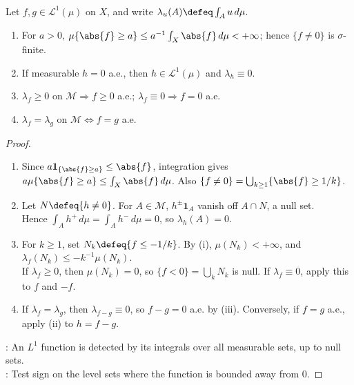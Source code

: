 \begin{proposition} \label{prop:l1-level-sets-null-and-indefinite-integrals} \\
Let $f,g\in\mathscr{L}^1(\mu)$ on $X$, and write $\lambda_u(A)\defeq\int_Au\,d\mu$.
\begin{enumerate}[label=(\roman*)]
\setlength{\itemsep}{0pt}
\item For $a>0$, $\mu\{\abs{f}\geq a\}\leq a^{-1}\int_X\abs{f}\,d\mu<+\infty$; hence $\{f\neq0\}$ is $\sigma$-finite.
\item If measurable $h=0$ a.e., then $h\in\mathscr{L}^1(\mu)$ and $\lambda_h\equiv0$.
\item $\lambda_f\geq0$ on $\mathcal{M}\Longrightarrow f\geq0$ a.e.; $\lambda_f\equiv0\Longrightarrow f=0$ a.e.
\item $\lambda_f=\lambda_g$ on $\mathcal{M}\Longleftrightarrow f=g$ a.e.
\end{enumerate}
\begin{proof}
\begin{enumerate}[label=(\roman*)]
\setlength{\itemsep}{0pt}
\item Since $a\mathbf{1}_{\{\abs{f}\geq a\}}\leq\abs{f}$, integration gives $a\mu\{\abs{f}\geq a\}\leq\int_X\abs{f}\,d\mu$. Also $\{f\neq0\}=\bigcup_{k\geq1}\{\abs{f}\geq1/k\}$.
\item Let $N\defeq\{h\neq0\}$. For $A\in\mathcal{M}$, $h^\pm\mathbf{1}_A$ vanish off $A\cap N$, a null set.\\
Hence $\int_Ah^+\,d\mu=\int_Ah^-\,d\mu=0$, so $\lambda_h(A)=0$.
\item For $k\geq1$, set $N_k\defeq\{f\leq-1/k\}$. By (i), $\mu(N_k)<+\infty$, and $\lambda_f(N_k)\leq-k^{-1}\mu(N_k)$.\\
If $\lambda_f\geq0$, then $\mu(N_k)=0$, so $\{f<0\}=\bigcup_kN_k$ is null. If $\lambda_f\equiv0$, apply this to $f$ and $-f$.
\item If $\lambda_f=\lambda_g$, then $\lambda_{f-g}\equiv0$, so $f-g=0$ a.e. by (iii). Conversely, if $f=g$ a.e., apply (ii) to $h=f-g$.
\end{enumerate}
: An $L^1$ function is detected by its integrals over all measurable sets, up to null sets.\\
: Test sign on the level sets where the function is bounded away from $0$.
\end{proof}
\end{proposition}

